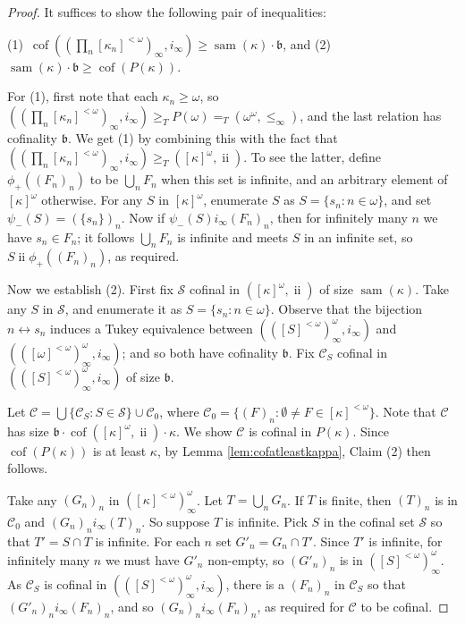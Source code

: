 \documentclass{article}
\newcommand{\gtq}{\ge_{T}}
\newcommand{\gte}{=_{T}}
\DeclareMathOperator{\ii}{ii}
\DeclareMathOperator{\cof}{cof}
\begin{document}
\begin{proof}
It suffices to show the following pair of inequalities: 

(1)~$\cof(\left(\prod_n [\kappa_n]^{<\omega}\right)_\infty,i_\infty) \ge \mathop{sam}(\kappa)\cdot\mathfrak{b}$, and 
(2)~$\mathop{sam}(\kappa)\cdot\mathfrak{b}  \ge \cof(P(\kappa))$.

\smallskip

For (1), first note that each $\kappa_n \ge \omega$, so $(\left(\prod_n [\kappa_n]^{<\omega}\right)_\infty,i_\infty) \gtq P(\omega) \gte (\omega^\omega,\le_\infty)$, and the last relation has cofinality $\mathfrak{b}$. 
We get (1) by combining this with the fact that  $(\left(\prod_n [\kappa_n]^{<\omega}\right)_\infty,i_\infty) \gtq ([\kappa]^\omega,\ii)$. 
To see the latter, define $\phi_+( (F_n)_n)$ to be $\bigcup_n F_n$ when this set is infinite, and an arbitrary element of $[\kappa]^\omega$ otherwise. 
For any $S$ in $[\kappa]^\omega$, enumerate $S$ as $S=\{s_n : n \in \omega\}$, and set $\psi_-(S)=( \{s_n\})_n$. 
Now if $\psi_-(S) i_\infty (F_n)_n$, then for infinitely many $n$ we have $s_n \in F_n$; it follows $\bigcup_n F_n$ is infinite and meets $S$ in an infinite set, so $S \ii \phi_+((F_n)_n)$, as required.

Now we establish (2). First fix $\mathcal{S}$ cofinal in $([\kappa]^\omega,\ii)$ of size $\mathop{sam}(\kappa)$. 
Take any $S$ in $\mathcal{S}$, and enumerate it as $S=\{s_n : n \in \omega\}$. Observe that the bijection $n \leftrightarrow s_n$ induces a Tukey equivalence between $( ([S]^{<\omega})^{\omega}_{\infty}, i_\infty)$ and $( ([\omega]^{<\omega})^{\omega}_{\infty}, i_\infty)$; and so both have cofinality $\mathfrak{b}$. Fix $\mathcal{C}_S$ cofinal in $( ([S]^{<\omega})^{\omega}_{\infty}, i_\infty)$ of size $\mathfrak{b}$. 

Let $\mathcal{C}= \bigcup \{ \mathcal{C}_S : S \in \mathcal{S}\} \cup \mathcal{C}_0$, where $\mathcal{C}_0 = \{ (F)_n : \emptyset \ne F \in [\kappa]^{<\omega}\}$. 
Note that $\mathcal{C}$ has size $\mathfrak{b} \cdot \cof( [\kappa]^{\omega},\ii)\cdot\kappa$. 
We show $\mathcal{C}$ is cofinal in $P(\kappa)$. Since $\cof(P(\kappa))$ is at least $\kappa$, by Lemma \ref{lem:cofatleastkappa}, 
Claim (2) then follows. 


Take any $(G_n)_n$ in $([\kappa]^{<\omega})^{\omega}_{\infty}$. Let $T=\bigcup_n G_n$. If $T$ is finite, then $(T)_n$ is in $\mathcal{C}_0$ and $(G_n)_n i_\infty (T)_n$. 
So suppose $T$ is infinite. Pick $S$ in the cofinal set $\mathcal{S}$ so that $T'=S \cap T$ is infinite. 
For each $n$ set $G'_n=G_n \cap T'$. Since $T'$ is infinite, for infinitely many $n$ we must have $G'_n$ non-empty, so  $(G'_n)_n$ is in $([S]^{<\omega})^{\omega}_{\infty}$.  
As $\mathcal{C}_S$ is cofinal in $(([S]^{<\omega})^{\omega}_{\infty},i_\infty)$, there is a $(F_n)_n$ in $\mathcal{C}_S$ so that $(G'_n)_n i_\infty (F_n)_n$, and so $(G_n)_n i_\infty (F_n)_n$,
as required for $\mathcal{C}$ to be cofinal.
\end{proof}
\end{document}
